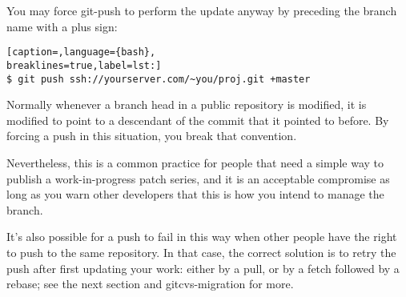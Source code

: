 You may force git-push to perform the update anyway by preceding the branch
name with a plus sign:
\lstset{basicstyle=\scriptsize, numbers=none, captionpos=b, tabsize=4}
\begin{lstlisting}[caption=,language={bash},
breaklines=true,label=lst:]
$ git push ssh://yourserver.com/~you/proj.git +master
\end{lstlisting}

Normally whenever a branch head in a public repository is modified, it is
modified to point to a descendant of the commit that it pointed to before. By
forcing a push in this situation, you break that convention.

Nevertheless, this is a common practice for people that need a simple way to
publish a work-in-progress patch series, and it is an acceptable compromise as
long as you warn other developers that this is how you intend to manage the
branch.

It's also possible for a push to fail in this way when other people have the
right to push to the same repository. In that case, the correct solution is to
retry the push after first updating your work: either by a pull, or by a fetch
followed by a rebase; see the next section and gitcvs-migration for more.
